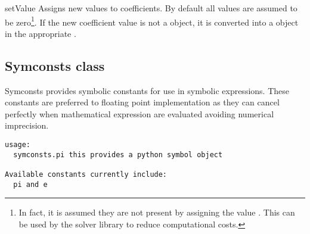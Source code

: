 \begin{methoddesc}[NonlinearPDE]{setValue}{
}
Assigns new values to coefficients. By default all values are assumed to be
zero\footnote{In fact, it is assumed they are not present by assigning the
value . This can be used by the solver library to reduce
computational costs.}.
If the new coefficient value is not a \Data object, it is converted into a
\Data object in the appropriate \FunctionSpace.
\end{methoddesc}

\subsection{Symconsts class}
Symconsts provides symbolic constants for use in symbolic expressions. These constants are preferred to floating point implementation as they can cancel perfectly when mathematical expression are evaluated avoiding numerical imprecision. 
\begin{verbatim}
usage:
  symconsts.pi this provides a python symbol object
  
Available constants currently include:
  pi and e 
\end{verbatim}


